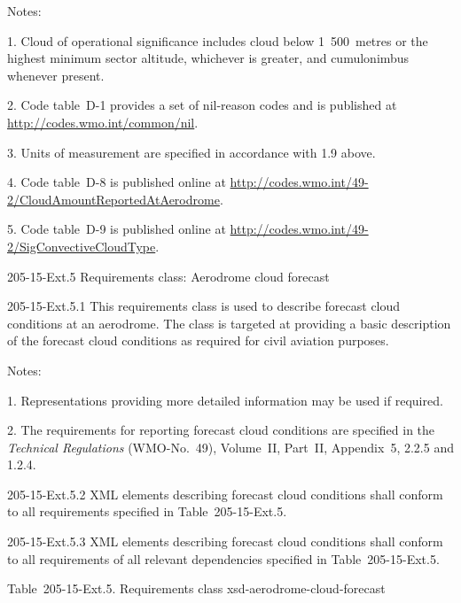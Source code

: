 Notes:

1. Cloud of operational significance includes cloud below 1~500~metres or the highest minimum sector altitude, whichever is greater, and cumulonimbus whenever present.

2. Code table~D-1 provides a set of nil-reason codes and is published at \url{http://codes.wmo.int/common/nil}.

3. Units of measurement are specified in accordance with 1.9 above.

4. Code table~D-8 is published online at \url{http://codes.wmo.int/49-2/CloudAmountReportedAtAerodrome}.

5. Code table~D-9 is published online at \url{http://codes.wmo.int/49-2/SigConvectiveCloudType}.

205-15-Ext.5 Requirements class: Aerodrome cloud forecast

205-15-Ext.5.1 This requirements class is used to describe forecast cloud conditions at an aerodrome. The class is targeted at providing a basic description of the forecast cloud conditions as required for civil aviation purposes.

Notes:

1. Representations providing more detailed information may be used if required.

2. The requirements for reporting forecast cloud conditions are specified in the \emph{Technical Regulations} (WMO-No.~49), Volume~II, Part~II, Appendix~5, 2.2.5 and 1.2.4.

205-15-Ext.5.2 XML elements describing forecast cloud conditions shall conform to all requirements specified in Table~205-15-Ext.5.

205-15-Ext.5.3 XML elements describing forecast cloud conditions shall conform to all requirements of all relevant dependencies specified in Table~205-15-Ext.5.

Table~205-15-Ext.5. Requirements class xsd-aerodrome-cloud-forecast

